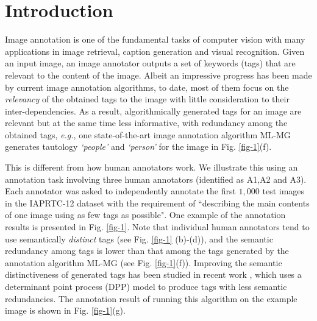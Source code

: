 \documentclass[10pt,twocolumn,letterpaper]{article}
\begin{document}
\section{Introduction}
\label{sec: introduction}

Image annotation is one of the fundamental tasks of computer vision with many applications in image retrieval, caption generation and visual recognition. Given an input image, an image annotator outputs a set of keywords (tags) that are relevant to the content of the image.  Albeit an impressive progress has been made by current image annotation algorithms, to date, most of them \cite{LEML-ICML-2014, my-iccv-2015, pairwise-ranking-jiebo-cvpr-2017} focus on the {\em relevancy} of the obtained tags to the image with little consideration to their inter-dependencies. As a result, algorithmically generated tags for an image are relevant but at the same time less informative, with redundancy among the obtained tags, {\it e.g.}, one state-of-the-art image annotation algorithm ML-MG \cite{my-iccv-2015} generates tautology {\it`people'} and {\it `person'} for the image in Fig. \ref{fig-1}(f). 

This is different from how human annotators work. We illustrate this using an annotation task involving three human annotators (identified as A1,A2 and A3). Each annotator was asked to independently annotate the first $1,000$ test images in the IAPRTC-12 dataset \cite{iaprtc-12-data-2006} with the requirement of ``describing the main contents of one image using as few tags as possible".  
% 
One example of the annotation results is presented in Fig. \ref{fig-1}. Note that individual human annotators tend to use semantically {\em distinct} tags (see Fig.  \ref{fig-1} (b)-(d)), and the semantic redundancy among tags is lower than that among the tags generated by the annotation algorithm ML-MG \cite{my-iccv-2015} (see Fig. \ref{fig-1}(f)).  
%
Improving the semantic distinctiveness of generated tags has been studied in recent work \cite{my-cvpr-2017-dia}, which uses a determinant point process (DPP) model \cite{dpp-for-machine-learning-2012} to produce tags with less semantic redundancies.
The annotation result of running this algorithm on the example image is shown in Fig. \ref{fig-1}(g).
\end{document}
